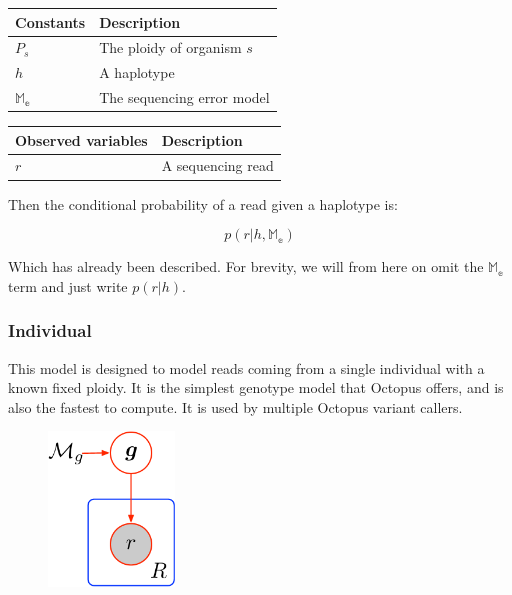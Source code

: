 \documentclass{article}
\begin{document}
\begin{center}
\begin{tabular}{ll}
Constants & Description \\
\hline
$P_s$ & The ploidy of organism $s$\\
$h$ & A haplotype \\
$\mathbb{M_{e}}$ & The sequencing error model \\
\hline
\end{tabular}
\end{center}

\begin{center}
\begin{tabular}{ll}
Observed variables & Description \\
\hline
$r$ & A sequencing read \\
\hline
\end{tabular}
\end{center}

Then the conditional probability of a read given a haplotype is:

\begin{equation}
\label{eq:read_prob}
    p(r | h, \mathbb{M_{e}})
\end{equation}

Which has already been described. For brevity, we will from here on omit the $\mathbb{M_{e}}$ term and just write $p(r | h)$.

\subsubsection{Individual}\label{genotype-model:individual}

This model is designed to model reads coming from a single individual with a known fixed ploidy. It is the simplest genotype model that Octopus offers, and is also the fastest to compute. It is used by multiple Octopus variant callers.

\begin{figure}[ht]
    \centering
    \includegraphics[width=0.3\textwidth]{figures/individual_model}
\end{figure}
\end{document}
